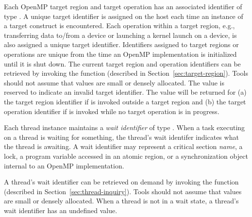 Each OpenMP target region and target operation has an associated identifier of type .
A unique target identifier is assigned on the host each time an instance of a target construct is encountered.
Each operation within a target region, e.g., transferring data to/from a device or launching a kernel launch
on a device, is also assigned a unique target identifier.
Identifiers assigned to target regions or operations
are unique from the time an OpenMP implementation is initialized until it is shut down.
The current target region and operation identifiers can be retrieved by invoking the  function (described in Section~\ref{sec:target-region}).
Tools should not assume that  values are small or densely allocated.
The value  is reserved to indicate an invalid target identifier.
The value  will be returned for (a) the target region identifier if  is invoked outside a target region and (b) the target operation identifier if  is invoked while no target operation is in progress.


Each thread instance maintains a {\em wait identifier} of type .
When a task executing on a thread is waiting for something, the thread's wait identifer indicates what the thread is awaiting.
A wait identifier may represent a critical section {\em name}, a lock,  a program variable accessed in an atomic region, or a synchronization object internal to an OpenMP implementation.
\begin{comment}
\begin{boxedcode}
typedef uint64\_t ompt\_wait\_id\_t;
\end{boxedcode}
\end{comment}
A thread's wait identifier can be retrieved on demand by invoking the  function (described in Section~\ref{sec:thread-inquiry}).
Tools should not assume that  values are small or densely allocated.
When a thread is not in a wait state, a thread's wait identifier has an undefined value.

